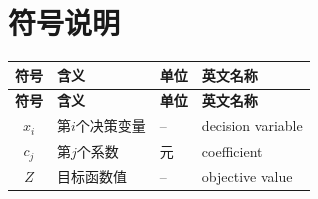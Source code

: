 
\section{符号说明}


\begin{longtable}{clll}
  \toprule
  \textbf{符号} & \textbf{含义} & \textbf{单位} & \textbf{英文名称} \\
  \midrule
  \endfirsthead
  \toprule
  \textbf{符号} & \textbf{含义} & \textbf{单位} & \textbf{英文名称} \\
  \midrule
  \endhead
  \bottomrule
  \endfoot

  $x_i$  & 第$i$个决策变量 & --  & decision variable \\
  $c_j$  & 第$j$个系数     & 元  & coefficient \\
  $Z$    & 目标函数值       & --  & objective value \\

\end{longtable}
